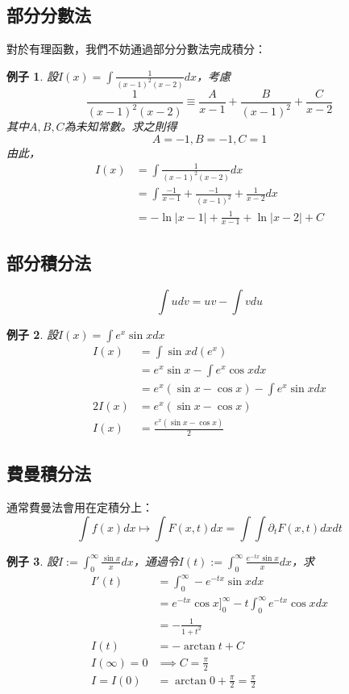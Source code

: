 \documentclass[12pt]{article}
\newtheorem*{example}{例子}
\begin{document}
    \subsection*{部分分數法}
    對於有理函數，我們不妨通過部分分數法完成積分：
    \begin{example}
        設$I(x)=\int \frac{1}{(x-1)^2(x-2)} dx$，考慮\[\frac{1}{(x-1)^2(x-2)}\equiv\frac{A}{x-1}+\frac{B}{(x-1)^2}+\frac{C}{x-2}\]其中$A,B,C$為未知常數。求之則得\[A=-1,B=-1,C=1\]
        由此，\begin{align*}
            I(x)&=\int \frac{1}{(x-1)^2(x-2)} dx\\
            &=\int \frac{-1}{x-1}+\frac{-1}{(x-1)^2}+\frac{1}{x-2} dx\\
            &=-\ln|x-1|+\frac{1}{x-1}+\ln|x-2|+C
        \end{align*}
    \end{example}
    \subsection*{部分積分法}
    
    \[\int u dv=uv - \int v du\]

    \begin{example}
        設$I(x)=\int e^x\sin{x} dx$
        \begin{align*}
            I(x)&=\int \sin{x} d(e^x)\\
            &=e^x\sin{x} - \int e^x\cos{x} dx\\
            &=e^x(\sin{x} - \cos{x}) - \int e^x\sin{x} dx\\
            2I(x)&=e^x(\sin{x} - \cos{x})\\
            I(x)&=\frac{e^x(\sin{x} - \cos{x})}{2}
        \end{align*}
    \end{example}
    \subsection*{費曼積分法}
    通常費曼法會用在定積分上：\[\int f(x) dx \mapsto \int F(x,t) dx = \int \int \partial_t F(x,t) dx dt\]

    \begin{example}
        設$I:=\int_{0}^{\infty} \frac{\sin{x}}{x} dx$，通過令$I(t):=\int_{0}^{\infty}\frac{e^{-tx}\sin{x}}{x}dx$，求\begin{align*}
            I'(t)&=\int_{0}^{\infty} -e^{-tx}\sin{x} dx\\
            &=e^{-tx}\cos{x}\bigg]_0^{\infty} - t\int_{0}^{\infty}e^{-tx}\cos{x}dx\\
            &=-\frac{1}{1+t^2}\\
            I(t)&=-\arctan{t}+C\\
            I(\infty)=0&\implies C=\frac{\pi}{2}\\
            I=I(0)&=\arctan{0}+\frac{\pi}{2}=\frac{\pi}{2}
        \end{align*}
    \end{example}
\end{document}
